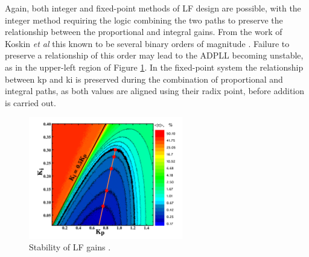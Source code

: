 Again, both integer and fixed-point methods of \ac{LF} design are possible, with the integer method requiring the logic combining the two paths to preserve the relationship between the proportional and integral gains. From the work of Koskin \textit{et al} this known to be several binary orders of magnitude \cite{koskin2018generation}. Failure to preserve a relationship of this order may lead to the \ac{ADPLL} becoming unstable, as in the upper-left region of Figure \ref{fig:gain_grid}. In the fixed-point system the relationship between \ac{kp} and \ac{ki} is preserved during the combination of proportional and integral paths, as both values are aligned using their radix point, before addition is carried out.
\begin{figure}[h]
	\centering
	\includegraphics[width=0.6\textwidth]{../eugene}
	\caption[Stability of \acl{LF} gains]{Stability of \acl{LF} gains \cite{koskin2018generation}.}
	\label{fig:gain_grid}
\end{figure}